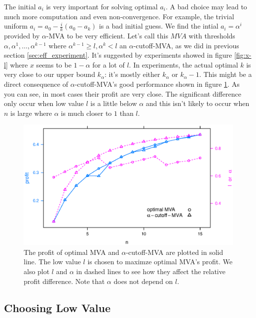 The initial $a_i$ is very important for solving optimal $a_i$. A bad choice may
lead to much more computation and even non-convergence. For example, the
trivial uniform $a_i = a_0 - \frac{i}{k}(a_0-a_k)$ is a bad initial guess. We
find the intial $a_i = \alpha^i$ provided by $\alpha$-MVA to be very efficient.
Let's call this $MVA$ with thresholds $\alpha, \alpha^1, \ldots, \alpha^{k-1}$
where $\alpha^{k-1} \geq l, \alpha^k < l$ an $\alpha$-cutoff-MVA, as we did in
previous section \ref{sec:eff_experiment}.  It's suggested by experiments
showed in figure \ref{fig:x-l} where $x$ seems to be $1-\alpha$ for a lot of
$l$. In experiments, the actual optimal $k$ is very close to our upper bound
$k_\alpha$: it's mostly either $k_\alpha$ or $k_\alpha-1$.  This might be a
direct consequence of $\alpha$-cutoff-MVA's good performance shown in figure
\ref{fig:cutoff}. As you can see, in most cases their profit are very close.
The significant difference only occur when low value $l$ is a little below
$\alpha$ and this isn't likely to occur when $n$ is large where $\alpha$ is
much closer to $1$ than $l$.

\begin{figure}
\centering
    \includegraphics[width=\linewidth]{figures/cutoff_.2_.1_15.eps}
    \caption{The profit of optimal MVA and $\alpha$-cutoff-MVA are plotted in
    solid line.  The low value $l$ is chosen to maximze optimal MVA's profit.
    We also plot $l$ and $\alpha$ in dashed lines to see how they affect the
    relative profit difference.  Note that $\alpha$ does not depend on
    $l$.}\label{fig:cutoff}
\end{figure}

\subsection{Choosing Low Value}

